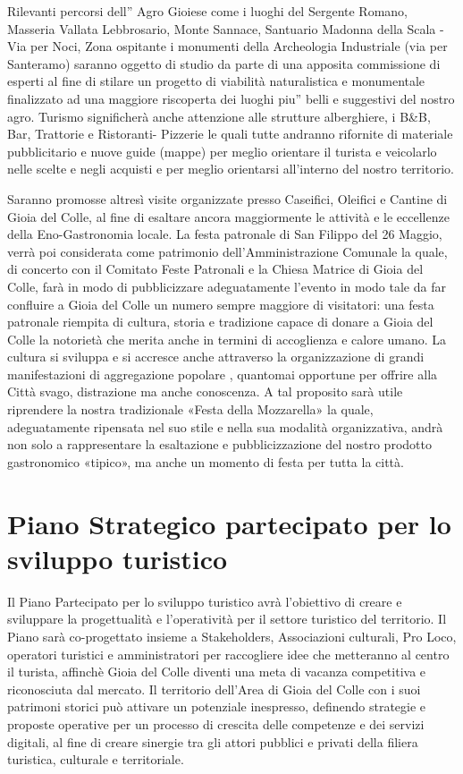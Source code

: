 \documentclass[a4paper,14pt,italian]{sphinxmanual}
\begin{document}
Rilevanti percorsi dell” Agro Gioiese come i luoghi del Sergente Romano, Masseria Vallata Lebbrosario, Monte Sannace, Santuario Madonna della Scala - Via per Noci, Zona ospitante i monumenti della Archeologia Industriale (via per Santeramo) saranno oggetto di studio da parte di una apposita commissione di esperti al fine di stilare un progetto di viabilità naturalistica e monumentale finalizzato ad una maggiore riscoperta dei luoghi piu” belli e suggestivi del nostro agro.
Turismo significherà anche attenzione alle strutture alberghiere, i B\&B, Bar, Trattorie e Ristoranti- Pizzerie le quali tutte andranno rifornite di materiale pubblicitario e nuove guide (mappe) per meglio orientare il turista e veicolarlo nelle scelte e negli acquisti e per meglio orientarsi all’interno del nostro territorio.

Saranno promosse altresì visite organizzate presso Caseifici, Oleifici e Cantine di Gioia del Colle, al fine di esaltare ancora maggiormente le attività e le eccellenze della Eno-Gastronomia locale. La festa patronale di San Filippo del 26 Maggio, verrà poi considerata come patrimonio dell’Amministrazione Comunale la quale, di concerto con il Comitato Feste Patronali e la Chiesa Matrice di Gioia del Colle, farà in modo di pubblicizzare adeguatamente l’evento in modo tale da far confluire a Gioia del Colle un numero sempre maggiore di visitatori: una festa patronale riempita di cultura, storia e tradizione capace di donare a Gioia del Colle la notorietà che merita anche in termini di accoglienza e calore umano.
La cultura si sviluppa e si accresce anche attraverso la organizzazione di grandi manifestazioni di aggregazione popolare , quantomai opportune per offrire alla Città svago, distrazione ma anche conoscenza. A tal proposito sarà utile riprendere la nostra tradizionale «Festa della Mozzarella» la quale, adeguatamente ripensata nel suo stile e nella sua modalità organizzativa, andrà non solo a rappresentare la esaltazione e pubblicizzazione del nostro prodotto gastronomico «tipico», ma anche un momento di festa per tutta la città.


\section{Piano Strategico partecipato per lo sviluppo turistico}
\label{\detokenize{turismo:piano-strategico-partecipato-per-lo-sviluppo-turistico}}
Il Piano Partecipato per lo sviluppo turistico avrà l’obiettivo di creare e sviluppare la progettualità e l’operatività per il settore turistico del territorio.
Il Piano sarà co-progettato insieme a Stakeholders, Associazioni culturali, Pro Loco, operatori turistici e amministratori per raccogliere idee che metteranno al centro il turista, affinchè Gioia del Colle diventi una meta di vacanza competitiva e riconosciuta dal mercato.
Il territorio dell’Area di Gioia del Colle con i suoi patrimoni storici può attivare un potenziale inespresso, definendo strategie e proposte operative per un processo di crescita delle competenze e dei servizi digitali, al fine di creare sinergie tra gli attori pubblici e privati della filiera turistica, culturale e territoriale.
\end{document}
